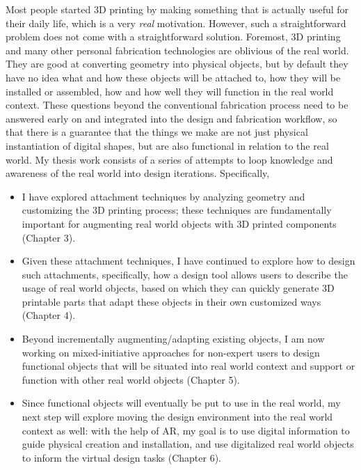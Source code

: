 %
Most people started 3D printing by making something that is actually useful for their daily life, which is a very \textit{real} motivation. However, such a straightforward problem does not come with a straightforward solution. Foremost, 3D printing and many other personal fabrication technologies are oblivious of the real world. They are good at converting geometry into physical objects, but by default they have no idea what and how these objects will be attached to, how they will be installed or assembled, how and how well they will function in the real world context. These questions beyond the conventional fabrication process need to be answered early on and integrated into the design and fabrication workflow, so that there is a guarantee that the things we make are not just physical instantiation of digital shapes, but are also functional in relation to the real world. My thesis work consists of a series of attempts to loop knowledge and awareness of the real world into design iterations. Specifically,

\begin{itemize}
	\item I have explored attachment techniques by analyzing geometry and customizing the 3D printing process; these techniques are fundamentally important for augmenting real world objects with 3D printed components (Chapter 3).
	\item Given these attachment techniques, I have continued to explore how to design such attachments, specifically, how a design tool allows users to describe the usage of real world objects, based on which they can quickly generate 3D printable parts that adapt these objects in their own customized ways (Chapter 4).
	\item Beyond incrementally augmenting/adapting existing objects, I am now working on mixed-initiative approaches for non-expert users to design functional objects that will be situated into real world context and support or function with other real world objects (Chapter 5).
	\item Since functional objects will eventually be put to use in the real world, my next step will explore moving the design environment into the real world context as well: with the help of AR, my goal is to use digital information to guide physical creation and installation, and use digitalized real world objects to inform the virtual design tasks (Chapter 6).
\end{itemize}

